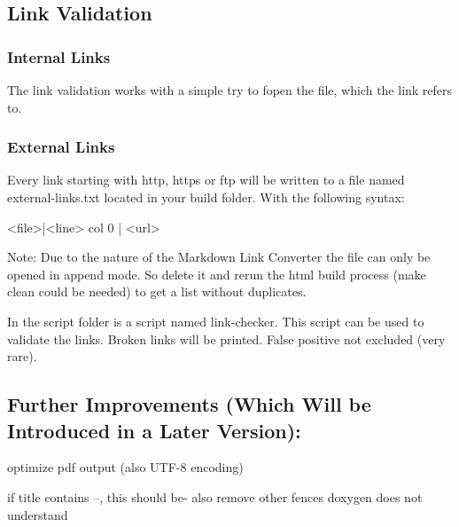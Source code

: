 \subsection*{Link Validation}

\subsubsection*{Internal Links}

The link validation works with a simple try to {\ttfamily fopen} the file, which the link refers to.

\subsubsection*{External Links}

Every link starting with {\ttfamily http}, {\ttfamily https} or {\ttfamily ftp} will be written to a file named {\ttfamily external-\/links.\+txt} located in your build folder. With the following syntax\+: \begin{DoxyVerb}<file>|<line> col 0 | <url>
\end{DoxyVerb}


Note\+: Due to the nature of the Markdown Link Converter the file can only be opened in append mode. So delete it and rerun the html build process ({\ttfamily make clean} could be needed) to get a list without duplicates.

In the script folder is a script named {\ttfamily link-\/checker}. This script can be used to validate the links. Broken links will be printed. False positive not excluded (very rare).

\subsection*{Further Improvements (Which Will be Introduced in a Later Version)\+:}


\begin{DoxyItemize}
\item optimize pdf output (also U\+T\+F-\/8 encoding)
\item if title contains --, this should be-\/ also remove other fences doxygen does not understand 
\end{DoxyItemize}
